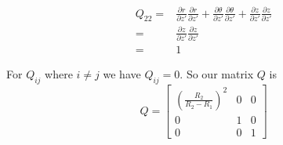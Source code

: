 \documentclass{amsart}
\begin{document}
\begin{align*}
Q_{22}
=&\frac{\partial r}{\partial z'}\frac{\partial r}{\partial z'}
+\frac{\partial \theta}{\partial z'}\frac{\partial \theta}{\partial z'}
+\frac{\partial z}{\partial z'}\frac{\partial z}{\partial z'}\\
=&\frac{\partial z}{\partial z'}\frac{\partial z}{\partial z'}\\
=&1
\end{align*}

For $Q_{ij}$ where $i\neq j$ we have $Q_{ij}=0$. So our matrix $Q$ is
\[
  Q=\begin{bmatrix}
    \left(\frac{R_2}{R_2-R_1}\right)^2 & 0 & 0\\
    0 & 1 & 0\\
    0 & 0 & 1
  \end{bmatrix}
\]
\end{document}
